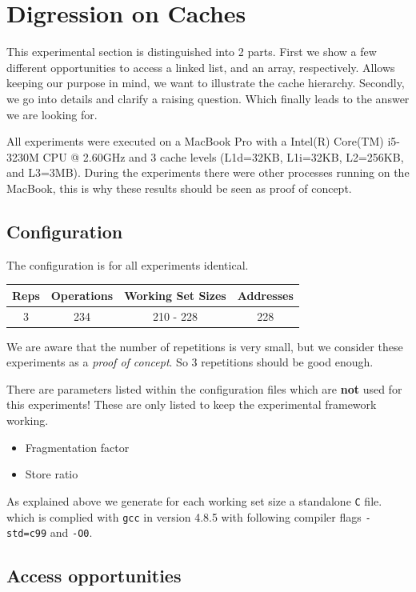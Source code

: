 \clearpage
\section{Digression on Caches}

This experimental section is distinguished into 2 parts. First we show a
few different opportunities to access a linked list, and an array,
respectively. Allows keeping our purpose in mind, we want to illustrate
the cache hierarchy. Secondly, we go into details and clarify a raising
question. Which finally leads to the answer we are looking for.

All experiments were executed on a MacBook Pro with a Intel(R) Core(TM)
i5-3230M CPU @ 2.60GHz and 3 cache levels (L1d=32KB, L1i=32KB, L2=256KB,
and L3=3MB). During the experiments there were other processes running
on the MacBook, this is why these results should be seen as proof of
concept.

\subsection{Configuration}\label{configuration-3}

The configuration is for all experiments identical.

\begin{longtable}[c]{@{}cccc@{}}
\toprule
Reps & Operations & Working Set Sizes & Addresses\tabularnewline
\midrule
\endhead
3 & 234 & 210 - 228 & 228\tabularnewline
\bottomrule
\end{longtable}

We are aware that the number of repetitions is very small, but we
consider these experiments as a \emph{proof of concept}. So 3
repetitions should be good enough.

There are parameters listed within the configuration files which are
\textbf{not} used for this experiments! These are only listed to keep
the experimental framework working.

\begin{itemize}
\tightlist
\item
  Fragmentation factor
\item
  Store ratio
\end{itemize}

As explained above we generate for each working set size a standalone
\texttt{C} file. which is complied with \texttt{gcc} in version 4.8.5
with following compiler flags \texttt{-std=c99} and \texttt{-O0}.

\hypertarget{access-opportunities}{\subsection{Access
opportunities}\label{access-opportunities}}

